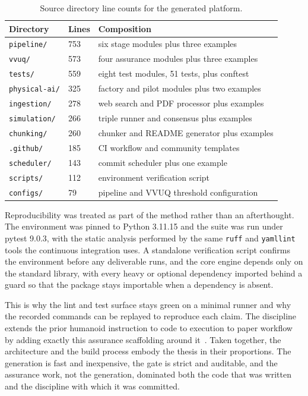 \begin{table}[H]
\caption{Source directory line counts for the generated platform.}
\label{tab:methods_dirlines}
\centering
\begin{tabularx}{\textwidth}{L{3.2cm} C{2.4cm} >{\raggedright\arraybackslash}X}
\toprule
\textbf{Directory} & \textbf{Lines} & \textbf{Composition} \\
\midrule
  \texttt{pipeline/}    & 753 & six stage modules plus three examples \\
  \texttt{vvuq/}        & 573 & four assurance modules plus three examples \\
  \texttt{tests/}       & 559 & eight test modules, 51 tests, plus conftest \\
  \texttt{physical-ai/} & 325 & factory and pilot modules plus two examples \\
  \texttt{ingestion/}   & 278 & web search and PDF processor plus examples \\
  \texttt{simulation/}  & 266 & triple runner and consensus plus examples \\
  \texttt{chunking/}    & 260 & chunker and README generator plus examples \\
  \texttt{.github/}     & 185 & CI workflow and community templates \\
  \texttt{scheduler/}   & 143 & commit scheduler plus one example \\
  \texttt{scripts/}     & 112 & environment verification script \\
  \texttt{configs/}     & 79  & pipeline and VVUQ threshold configuration \\
\bottomrule
\end{tabularx}
\end{table}

Reproducibility was treated as part of the method rather than an afterthought. The
environment was pinned to Python 3.11.15 and the suite was run under pytest
9.0.3, with the static analysis performed by the same \texttt{ruff} and
\texttt{yamllint} tools the continuous integration uses. A standalone verification
script confirms the environment before any deliverable runs, and the core engine
depends only on the standard library, with every heavy or optional dependency
imported behind a guard so that the package stays importable when a dependency is
absent. 

This is why the lint and test surface stays green on a minimal runner and
why the recorded commands can be replayed to reproduce each claim. The discipline
extends the prior humanoid instruction to code to execution to paper workflow by
adding exactly this assurance scaffolding around it~\cite{anthropicclaudecodeweb}. Taken together, the architecture and the build process embody the thesis in their
proportions. The generation is fast and inexpensive, the gate is strict and
auditable, and the assurance work, not the generation, dominated both the code
that was written and the discipline with which it was committed.
